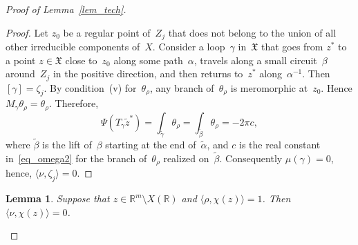 \documentclass[reqno,tbtags,12pt]{amsart}
\numberwithin{equation}{section}
\newcommand{\R}{\mathbb{R}}
\newcommand{\FX}{\mathfrak{X}}
\newtheorem{lem}[theorem]{Lemma}
\theoremstyle{definition}
\begin{document}
\begin{proof}[Proof of Lemma~\ref{lem_tech}]
\begin{proof}
Let $z_0$ be a regular point of~$Z_j$ that does not belong to the union of all other irreducible components of~$X$. Consider a loop~$\gamma$ in~$\FX$  that goes from $z^*$ to a point $z\in \FX$ close to~$z_0$ along some path~$\alpha$,  travels  along a small circuit~$\beta$ around~$Z_j$ in the positive direction, and then returns to~$z^*$ along~$\alpha^{-1}$. Then $[\gamma]=\zeta_j$. By condition~(v) for~$\theta_{\rho}$, any branch of~$\theta_{\rho}$ is meromorphic at~$z_0$. Hence $M_{\gamma}\theta_{\rho}=\theta_{\rho}$. Therefore,
\begin{equation}\label{eq_2pic}
\Psi(T_{\gamma}\tilde z^*)=\int_{\tilde\gamma}\theta_{\rho}=\int_{\tilde\beta}\theta_{\rho}=-2\pi c,
\end{equation}
where $\tilde\beta$ is the lift of~$\beta$ starting at the end of~$\tilde\alpha$, and $c$ is the real constant in~\eqref{eq_omega2} for the branch of~$\theta_{\rho}$ realized on~$\tilde\beta$.
Consequently $\mu(\gamma)=0$, hence, $\langle\nu,\zeta_j\rangle=0$.
\end{proof}


\begin{lem}\label{slem_nu_chi}
Suppose that $z\in\R^m\setminus X(\R)$ and $\langle\rho,\chi(z)\rangle=1$. Then $\langle\nu,\chi(z)\rangle=0$.
\end{lem}



\end{proof}
\end{document}
